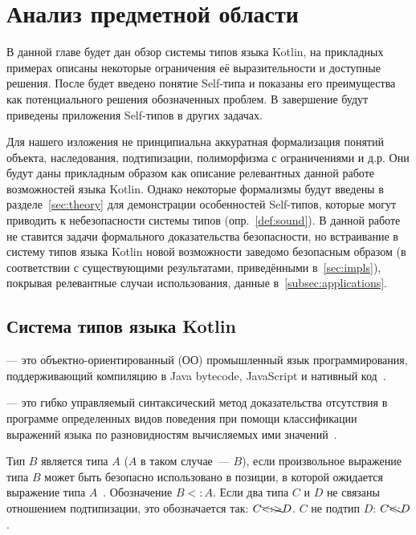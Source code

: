 

\section{Анализ предметной области}

В данной главе будет дан обзор системы типов языка Kotlin, на прикладных примерах описаны некоторые ограничения её выразительности и доступные решения.
После будет введено понятие Self-типа и показаны его преимущества как потенциального решения обозначенных проблем.
В завершение будут приведены приложения Self-типов в других задачах.

Для нашего изложения не принципиальна аккуратная формализация понятий объекта, наследования, подтипизации, полиморфизма с ограничениями и д.р.
Они будут даны прикладным образом как описание релевантных данной работе возможностей языка Kotlin.
Однако некоторые формализмы будут введены в разделе~\ref{sec:theory} для демонстрации особенностей Self-типов, которые могут приводить к небезопасности системы типов (опр.~\ref{def:sound}).
В данной работе не ставится задачи формального доказательства безопасности, но встраивание в систему типов языка Kotlin новой возможности заведомо безопасным образом (в соответствии с существующими результатами, приведёнными в~\ref{sec:impls}), покрывая релевантные случаи использования, данные в~\ref{subsec:applications}.


\subsection{Система типов языка Kotlin}

 --- это объектно-ориентированный (ОО) промышленный язык программирования, поддерживающий компиляцию в Java bytecode, JavaScript и нативный код~\cite{jemerov2017kotlin}.

\begin{definition}
     --- это гибко управляемый синтаксический метод доказательства отсутствия в программе определенных видов поведения при помощи классификации выражений языка по разновидностям вычисляемых ими значений~\cite{pierce2002types}.
\end{definition}

\begin{definition}
    \label{def:subtype}
    Тип $B$ является  типа $A$ ($A$ в таком случае~---  $B$), если произвольное выражение типа $B$ может быть безопасно использовано в позиции, в которой ожидается выражение типа $A$~\cite{liskov1987keynote, pierce2002types}.
    Обозначение $B <: A$.
    Если два типа $C$ и $D$ не связаны отношением подтипизации, это обозначается так: $C \bcancel{<:>} D$.
    $C$ не подтип $D$: $C \bcancel{<:} D$.
\end{definition}

